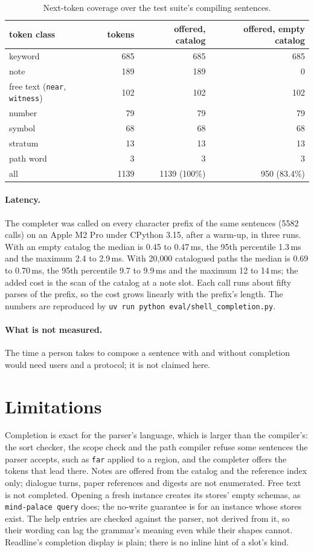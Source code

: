 \documentclass[11pt]{article}
\theoremstyle{plain}
\theoremstyle{definition}
\theoremstyle{remark}
\newcommand{\code}[1]{\texttt{#1}}
\begin{document}
\begin{table}[ht]
\centering
\begin{tabular}{lrrr}
\toprule
token class & tokens & offered, catalog & offered, empty catalog \\
\midrule
keyword & 685 & 685 & 685 \\
note & 189 & 189 & 0 \\
free text (\code{near}, \code{witness}) & 102 & 102 & 102 \\
number & 79 & 79 & 79 \\
symbol & 68 & 68 & 68 \\
stratum & 13 & 13 & 13 \\
path word & 3 & 3 & 3 \\
\midrule
all & 1139 & 1139 (100\%) & 950 (83.4\%) \\
\bottomrule
\end{tabular}
\caption{Next-token coverage over the test suite's compiling sentences.}
\label{tab:coverage}
\end{table}

\paragraph{Latency.} The completer was called on every character prefix of the same sentences
(5582 calls) on an Apple M2 Pro under CPython 3.15, after a warm-up, in three runs. With an empty
catalog the median is 0.45 to 0.47\,ms, the 95th percentile 1.3\,ms and the maximum 2.4 to
2.9\,ms. With 20{,}000 catalogued paths the median is 0.69 to 0.70\,ms, the 95th percentile 9.7
to 9.9\,ms and the maximum 12 to 14\,ms; the added cost is the scan of the catalog at a note slot.
Each call runs about fifty parses of the prefix, so the cost grows linearly with the prefix's
length. The numbers are reproduced by \code{uv run python eval/shell\_completion.py}.

\paragraph{What is not measured.} The time a person takes to compose a sentence with and without
completion would need users and a protocol; it is not claimed here.

\section{Limitations}
Completion is exact for the parser's language, which is larger than the compiler's: the sort
checker, the scope check and the path compiler refuse some sentences the parser accepts, such as
\code{far} applied to a region, and the completer offers the tokens that lead there. Notes are
offered from the catalog and the reference index only; dialogue turns, paper references and
digests are not enumerated. Free text is not completed. Opening a fresh instance creates its
stores' empty schemas, as \code{mind-palace query} does; the no-write guarantee is for an instance
whose stores exist. The help entries are checked against the parser, not derived from it, so their
wording can lag the grammar's meaning even while their shapes cannot. Readline's completion
display is plain; there is no inline hint of a slot's kind.
\end{document}

